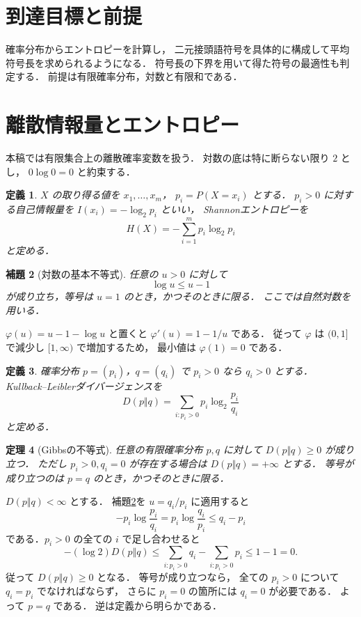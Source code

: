 \documentclass[a5paper,10pt,onecolumn]{jsarticle}
\makeatletter
\theoremstyle{mathnotetheorem}
\newtheorem{theorem}{定理}[section]
\newtheorem{definition}[theorem]{定義}
\newtheorem{lemma}[theorem]{補題}
\renewcommand{\proofname}{証明}
\renewenvironment{proof}[1][\proofname]{%
  \par\pushQED{\qed}\normalfont\topsep4\p@\@plus2\p@\relax
  \trivlist\item[\hskip\labelsep\bfseries #1]\ignorespaces
}{\popQED\endtrivlist\@endpefalse}
\makeatother
\begin{document}
\section*{到達目標と前提}
確率分布からエントロピーを計算し，
二元接頭語符号を具体的に構成して平均符号長を求められるようになる．
符号長の下界を用いて得た符号の最適性も判定する．
前提は有限確率分布，対数と有限和である．

\section{離散情報量とエントロピー}

本稿では有限集合上の離散確率変数を扱う．
対数の底は特に断らない限り $2$ とし，
$0\log 0=0$ と約束する．

\begin{definition}
$X$ の取り得る値を $x_1,\dots,x_m$，
$p_i=P(X=x_i)$ とする．
$p_i>0$ に対する自己情報量を
$I(x_i)=-\log_2p_i$ といい，
\emph{Shannonエントロピー}を
\[
 H(X)=-\sum_{i=1}^mp_i\log_2p_i
\]
と定める．
\end{definition}

\begin{lemma}[対数の基本不等式]\label{lem:log}
任意の $u>0$ に対して
\[
 \log u\le u-1
\]
が成り立ち，等号は $u=1$ のとき，かつそのときに限る．
ここでは自然対数を用いる．
\end{lemma}
\begin{proof}
$\varphi(u)=u-1-\log u$ と置くと
$\varphi'(u)=1-1/u$ である．
従って $\varphi$ は $(0,1]$ で減少し
$[1,\infty)$ で増加するため，
最小値は $\varphi(1)=0$ である．
\end{proof}

\begin{definition}
確率分布 $p=(p_i)$，$q=(q_i)$ で
$p_i>0$ なら $q_i>0$ とする．
Kullback--Leiblerダイバージェンスを
\[
 D(p\Vert q)=\sum_{i:p_i>0}
 p_i\log_2\frac{p_i}{q_i}
\]
と定める．
\end{definition}

\begin{theorem}[Gibbsの不等式]\label{thm:gibbs}
任意の有限確率分布 $p,q$ に対して
$D(p\Vert q)\ge0$ が成り立つ．
ただし $p_i>0,q_i=0$ が存在する場合は
$D(p\Vert q)=+\infty$ とする．
等号が成り立つのは $p=q$ のとき，かつそのときに限る．
\end{theorem}
\begin{proof}
$D(p\Vert q)<\infty$ とする．
補題\ref{lem:log}を
$u=q_i/p_i$ に適用すると
\[
 -p_i\log\frac{p_i}{q_i}
 =p_i\log\frac{q_i}{p_i}
 \le q_i-p_i
\]
である．$p_i>0$ の全ての $i$ で足し合わせると
\[
 -(\log 2)D(p\Vert q)
 \le\sum_{i:p_i>0}q_i-\sum_{i:p_i>0}p_i
 \le1-1=0.
\]
従って $D(p\Vert q)\ge0$ となる．
等号が成り立つなら，
全ての $p_i>0$ について $q_i=p_i$ でなければならず，
さらに $p_i=0$ の箇所には $q_i=0$ が必要である．
よって $p=q$ である．
逆は定義から明らかである．
\end{proof}
\end{document}
